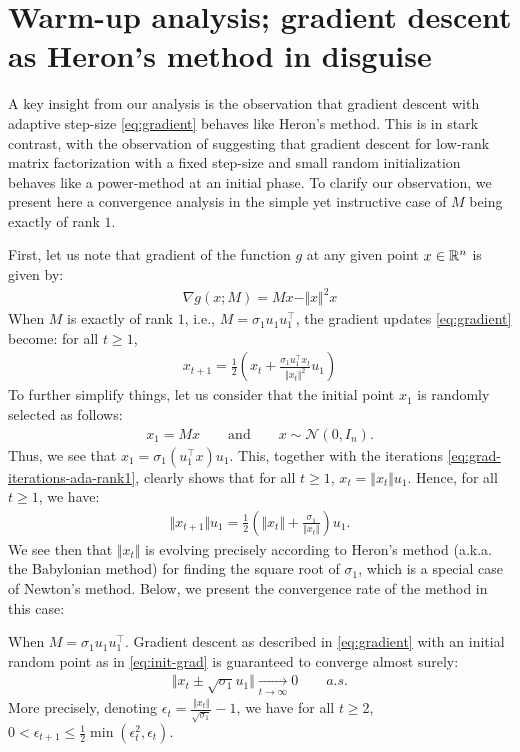 \section{Warm-up analysis; gradient descent as Heron's method in disguise}

A key insight from our analysis is the observation that gradient descent with adaptive step-size \eqref{eq:gradient} behaves like Heron's method. This is in stark contrast, with the observation of \cite{stoger2021small} suggesting that gradient descent for low-rank matrix factorization with a fixed step-size and small random initialization behaves like a power-method at an initial phase. To clarify our observation, we present here a convergence analysis in the simple yet instructive case of $M$ being exactly of rank $1$. 

First, let us note that gradient of the function $g$ at any given point $x \in \mathbb{R}^{n}$ is given by: 
\begin{align}
    \nabla g (x;M) = M x - \Vert x \Vert^2 x 
\end{align}
When $M$ is exactly of rank $1$, i.e., $M = \sigma_1 u_1 u_1^\top$, the gradient updates \eqref{eq:gradient} become: for all $t \ge 1$,
\begin{align}\label{eq:grad-iterations-ada-rank1}
    x_{t+1} = \frac{1}{2} \left(x_t +  \frac{ \sigma_1  u_1^\top x_t }{\Vert x_t \Vert^2} u_1\right)
\end{align}
To further simplify things, let us consider that the initial point $x_1$ is randomly selected as follows: 
\begin{align}\label{eq:init-grad}
    x_1 = M x \qquad \text{and} \qquad x \sim \mathcal{N}(0, I_n). 
\end{align}
Thus, we see that $x_1 = \sigma_1 (u_1^\top x) u_1$. This, together with the iterations \eqref{eq:grad-iterations-ada-rank1}, clearly shows that for all $t \ge 1$,  $x_t = \Vert x_t \Vert u_1$. Hence, for all $t \ge 1$, we have:  
\begin{align}\label{eq:heron's iterates}
    \Vert x_{t+1} \Vert u_1 = \frac{1}{2}\left( \Vert x_t \Vert +  \frac{\sigma_1}{\Vert x_t \Vert} \right) u_1.
\end{align}
We see then that $\Vert x_t \Vert$ is evolving precisely according to Heron's method (a.k.a. the Babylonian method) for finding the square root of $\sigma_1$, which is a special case of Newton's method. Below, we present the convergence rate of the method in this case: 
\begin{proposition}\label{prop:grad convergence rank 1}
    When $M = \sigma_1 u_1 u_1^\top$. Gradient descent as described in \eqref{eq:gradient} with an initial random point as in \eqref{eq:init-grad} is guaranteed to converge almost surely:
    \begin{align}
        \Vert x_t \pm \sqrt{\sigma_1} u_1 \Vert \underset{t \to \infty}{\longrightarrow} 0 \qquad {a.s.}
    \end{align}
    More precisely, denoting $\epsilon_t = \frac{\Vert x_t \Vert}{\sqrt{\sigma_1}} - 1$, we have for all $t\ge 2$, $
         0 < \epsilon_{t+1} \le \frac{1}{2}\min( \epsilon_t^2, \epsilon_t).$
\end{proposition}

